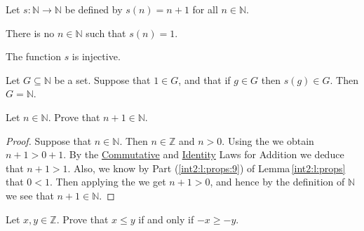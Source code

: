 \begin{theorem} %
	\label{int2:t:peano}
	Let $s: \mathbb{N} \to \mathbb{N}$ be defined by $s(n) = n + 1$ for all $n \in \mathbb{N}$.
	\begin{lenumerate}
		\item There is no $n \in \mathbb{N}$ such that $s(n) = 1$.
		\item The function $s$ is injective.
		\item Let $G \subseteq \mathbb{N}$ be a set. Suppose that $1 \in G$, and that if $g \in G$ then $s(g) \in G$. Then
		$G = \mathbb{N}$. \label{int2:t:peano:induction}
	\end{lenumerate}
\end{theorem}

\addtocounter{exercise}{1}
\Newpage
\begin{exercise} %
	Let $n \in \mathbb{N}$. Prove that $n + 1 \in \mathbb{N}$.
\end{exercise}

\begin{proof}
	Suppose that $n \in \mathbb{N}$. Then $n \in \mathbb{Z}$ and $n > 0$. Using the  we obtain $n + 1 > 0 + 1$. By the \hyperref[int2:d:oid:commutative_add]{Commutative} and \hyperref[int2:d:oid:identity_add]{Identity} Laws for Addition we deduce that $n + 1 > 1$. Also, we know by Part (\ref{int2:l:props:9}) of Lemma\,\ref{int2:l:props} that $0 < 1$. Then applying the  we get $n + 1 > 0$, and hence by the definition of $\mathbb{N}$ we see that $n + 1 \in \mathbb{N}$.
\end{proof}

\Newpage
\begin{exercise} %
	\label{int2:e:3}
	Let $x, y \in \mathbb{Z}$. Prove that $x \leq y$ if and only if $-x \geq -y$.
\end{exercise}

